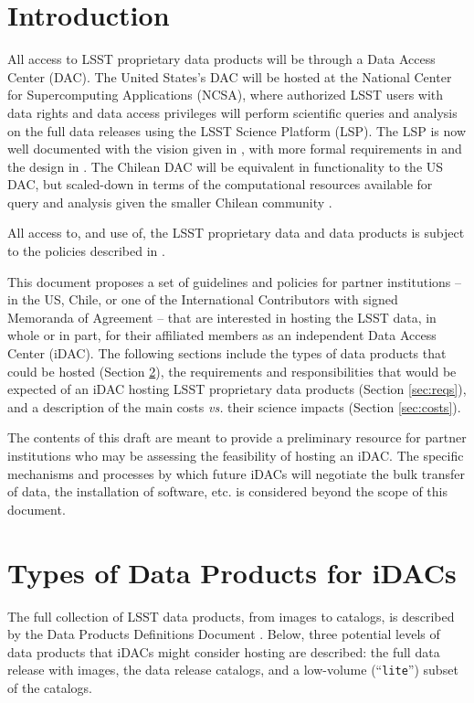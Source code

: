 
\section{Introduction}\label{sec:intro}

All access to LSST proprietary data products will be through a Data Access Center (DAC). The United States's DAC will be hosted at the National Center for Supercomputing Applications (NCSA), where authorized LSST users with data rights and data access privileges will perform scientific queries and analysis on the full data releases using the LSST Science Platform (LSP). The LSP is now well documented with the vision given in , with more formal requirements in  and the design in . The Chilean DAC will be equivalent in functionality to the US DAC, but scaled-down in terms of the computational resources available for query and analysis given the smaller Chilean community . 

All access to, and use of, the LSST proprietary data and data products is subject to the policies described in . 

This document proposes a set of guidelines and policies for partner institutions -- in the US, Chile, or one of the International Contributors with signed Memoranda of Agreement -- that are interested in hosting the LSST data, in whole or in part, for their affiliated members as an independent Data Access Center (iDAC). The following sections include the types of data products that could be hosted (Section \ref{sec:data}), the requirements and responsibilities that would be expected of an iDAC hosting LSST proprietary data products (Section \ref{sec:reqs}), and a description of the main costs {\it vs.} their science impacts (Section \ref{sec:costs}).

The contents of this draft are meant to provide a preliminary resource for partner institutions who may be assessing the feasibility of hosting an iDAC. The specific mechanisms and processes by which future iDACs will negotiate the bulk transfer of data, the installation of software, etc. is considered beyond the scope of this document.


\section{Types of Data Products for iDACs}\label{sec:data}

The full collection of LSST data products, from images to catalogs, is described by the Data Products Definitions Document . Below, three potential levels of data products that iDACs might consider hosting are described: the full data release with images, the data release catalogs, and a low-volume (``{\tt lite}'') subset of the catalogs.

